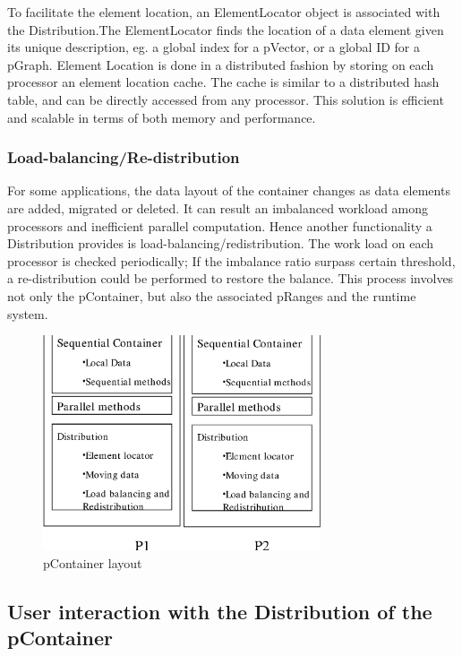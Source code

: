 \documentclass[12pt,epsfig]{article}
\begin{document}
To facilitate the element location, an ElementLocator object is
associated with the Distribution.The ElementLocator finds the
location of a data element given its unique description, eg. a global
index for a pVector, or a global ID for a pGraph.  Element Location is
done in a distributed fashion by storing on each processor an element
location cache. The cache is similar to a distributed hash table, and
can be directly accessed from any processor. This solution is efficient
and scalable in terms of both memory and performance.


\subsubsection{Load-balancing/Re-distribution}
For some applications, the data layout of the container changes as
data elements are added, migrated or deleted. It can result an
imbalanced workload among processors and inefficient parallel
computation. Hence another functionality a Distribution provides is
load-balancing/redistribution. The work load on each processor is
checked periodically; If the imbalance ratio surpass certain
threshold, a re-distribution could be performed to restore the
balance. This process involves not only the pContainer, but also the
associated pRanges and the runtime system.

\begin{figure}[t]
\renewcommand{\baselinestretch}{1.}
\normalsize
\begin{center}
\includegraphics[height=2.5in,trim=0 20 0 0]{fig0.eps}
\end{center}
\caption{pContainer layout}
\label{fig:fig0}
\end{figure}

\subsection{User interaction with the Distribution of the pContainer}
\end{document}
